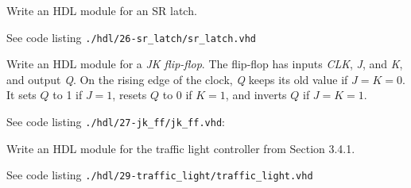 \documentclass[12pt]{article}
\newenvironment{ex}[2][Exercise]{\begin{trivlist}
		\item[\hskip \labelsep {\bfseries #1}\hskip \labelsep {\bfseries #2.}]}{\end{trivlist}}
\newenvironment{sol}[1][Solution]{\begin{trivlist}
		\item[\hskip \labelsep {\bfseries #1:}]}{\end{trivlist}}
\begin{document}
\begin{ex}{4.26}
	Write an HDL module for an SR latch.
\end{ex}

\begin{sol}
	See code listing \texttt{./hdl/26-sr\_latch/sr\_latch.vhd}
	
\end{sol}

\begin{ex}{4.27}
	Write an HDL module for a \emph{JK flip-flop}. The flip-flop has inputs \emph{CLK}, \emph{J}, and
	\emph{K}, and output \emph{Q}. On the rising edge of the clock, \emph{Q} keeps its old value if
	$J=K=0$. It sets $Q$ to 1 if $J=1$, resets $Q$ to 0 if $K=1$, and inverts $Q$ if $J=K=1$.
\end{ex}

\begin{sol}
	See code listing \texttt{./hdl/27-jk\_ff/jk\_ff.vhd}:
	
\end{sol}

\begin{ex}{4.29}
	Write an HDL module for the traffic light controller from Section 3.4.1.
\end{ex}

\begin{sol}
	See code listing \texttt{./hdl/29-traffic\_light/traffic\_light.vhd}
	
\end{sol}
\end{document}
